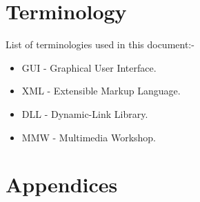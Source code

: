 \documentclass[conference]{IEEEtran}
\begin{document}
    \section{Terminology}
      List of terminologies used in this document:-
      \begin{itemize}
        \item GUI - Graphical User Interface.
        \item XML - Extensible Markup Language.
        \item DLL - Dynamic-Link Library.
        \item MMW - Multimedia Workshop.
      \end{itemize}
  
    \section{Appendices}

	\renewcommand\refname{\section{Reference List}}
	\small{
    }
\end{document}
